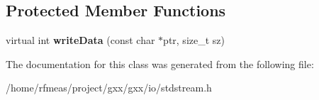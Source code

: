 \subsection*{Protected Member Functions}
\begin{DoxyCompactItemize}
\item 
virtual int {\bfseries write\+Data} (const char $\ast$ptr, size\+\_\+t sz)\hypertarget{classgxx_1_1io_1_1ostringstream_a50ad66ef01ddb0e64a50635fc5039830}{}\label{classgxx_1_1io_1_1ostringstream_a50ad66ef01ddb0e64a50635fc5039830}

\end{DoxyCompactItemize}


The documentation for this class was generated from the following file\+:\begin{DoxyCompactItemize}
\item 
/home/rfmeas/project/gxx/gxx/io/stdstream.\+h\end{DoxyCompactItemize}
